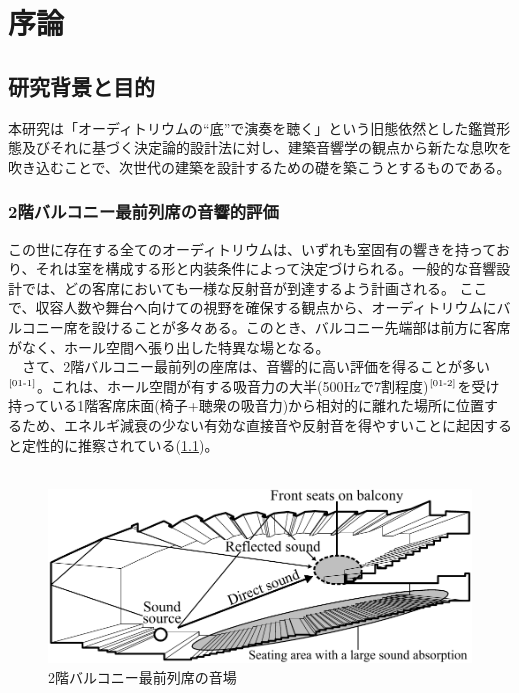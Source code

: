 \chapter{序論}
\thispagestyle{fancy}
\nobreak
\section{研究背景と目的}
本研究は「オーディトリウムの“底”で演奏を聴く」という旧態依然とした鑑賞形態及びそれに基づく決定論的設計法に対し、建築音響学の観点から新たな息吹を吹き込むことで、次世代の建築を設計するための礎を築こうとするものである。

\subsection{2階バルコニー最前列席の音響的評価}
この世に存在する全てのオーディトリウムは、いずれも室固有の響きを持っており、それは室を構成する形と内装条件によって決定づけられる。一般的な音響設計では、どの客席においても一様な反射音が到達するよう計画される。
ここで、収容人数や舞台へ向けての視野を確保する観点から、オーディトリウムにバルコニー席を設けることが多々ある。このとき、バルコニー先端部は前方に客席がなく、ホール空間へ張り出した特異な場となる。
\\　さて、2階バルコニー最前列の座席は、音響的に高い評価を得ることが多い$^{\text{\cite{01-1}}}$。これは、ホール空間が有する吸音力の大半(500Hzで7割程度)$^{\text{\cite{01-2}}}$を受け持っている1階客席床面(椅子+聴衆の吸音力)から相対的に離れた場所に位置するため、エネルギ減衰の少ない有効な直接音や反射音を得やすいことに起因すると定性的に推察されている(\ref{fig:2階バルコニー最前列席の音場})。
\\
\\
\begin{figure}[h]
    \centering
    \includegraphics[keepaspectratio,scale=0.8]{01_att/second_balcony.pdf}
    \caption{\hspace{1mm}2階バルコニー最前列席の音場}
    \label{fig:2階バルコニー最前列席の音場}
\end{figure}

